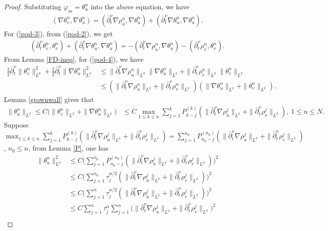 \documentclass[10pt,a4paper]{amsart}
\begin{document}
\begin{proof}
Substituting $\varphi_m=\theta_u^n$ into the above equation, we have
\begin{align}\label{pod-3}
(\nabla \theta_v^n,\nabla\theta_u^n) 
=(\bar\partial_t^\nu \nabla \rho_u^n,\nabla\theta_u^n)+(\bar\partial_t^\nu \nabla \theta_u^n,\nabla\theta_u^n).
\end{align}
For (\ref{pod-3}), from (\ref{pod-2}), we get
\begin{align}\label{pod-4}
(\bar\partial_t^\nu\theta_v^n,\theta_v^n)+(\bar\partial_t^\nu \nabla \theta_u^n,\nabla\theta_u^n)=-(\bar\partial_t^\nu \nabla \rho_u^n,\nabla\theta_u^n)-(\bar\partial_t^\nu \rho_v^n,\theta_v^n).
\end{align}
From Lemma \ref{FD-ineq}, for (\ref{pod-4}), we have
\begin{align*}
\frac12\bar\partial_t^\nu\|\theta_v^n\|_{L^2}^2+\frac12\bar\partial_t^\nu \|\nabla \theta_u^n\|_{L^2}^2
&\leq \|\bar\partial_t^\nu \nabla \rho_u^n\|_{L^2}\|\nabla\theta_u^n\|_{L^2}+\|\bar\partial_t^\nu \rho_v^n\|_{L^2}\|\theta_v^n\|_{L^2}\\
&\leq (\|\bar\partial_t^\nu \nabla \rho_u^n\|_{L^2}+\|\bar\partial_t^\nu \rho_v^n\|_{L^2})(\|\nabla\theta_u^n\|_{L^2}+\|\theta_v^n\|_{L^2}).
\end{align*}
Lemma \ref{grownwall} gives that 
\begin{align*}
\|\theta_u^n\|_{L^2}\leq C\big(\|\theta_v^n\|_{L^2}+ \|\nabla \theta_u^n\|_{L^2}\big) 
&\leq C\max_{1\leq k\leq n}\sum_{j=1}^kP_{k-j}^{(k)}(\|\bar\partial_t^\nu \nabla \rho_u^j\|_{L^2}+\|\bar\partial_t^\nu \rho_v^j\|_{L^2}),~1\leq n\leq N.
\end{align*}
Suppose $\max_{1\leq k\leq n}\sum_{j=1}^kP_{k-j}^{(k)}(\|\bar\partial_t^\nu \nabla \rho_u^j\|_{L^2}+\|\bar\partial_t^\nu \rho_v^j\|_{L^2})=\sum_{j=1}^{n_0}P_{n_0-j}^{({n_0})}(\|\bar\partial_t^\nu \nabla \rho_u^j\|_{L^2}+\|\bar\partial_t^\nu \rho_v^j\|_{L^2})$, $n_0\leq n$, from Lemma \ref{P}, one has
\begin{align*}
\|\theta_u^n\|_{L^2}^2
&\leq C\bigg(\sum_{j=1}^{n_0}P_{n_0-j}^{({n_0})}(\|\bar\partial_t^\nu \nabla \rho_u^j\|_{L^2}+\|\bar\partial_t^\nu \rho_v^j\|_{L^2})\bigg)^2\\
&\leq C\bigg(\sum_{j=1}^{n_0}\tau_j^{\alpha/2}(\|\bar\partial_t^\nu \nabla \rho_u^j\|_{L^2}+\|\bar\partial_t^\nu \rho_v^j\|_{L^2})\bigg)^2\\
&\leq C\bigg(\sum_{j=1}^{n}\tau_j^{\alpha/2}(\|\bar\partial_t^\nu \nabla \rho_u^j\|_{L^2}+\|\bar\partial_t^\nu \rho_v^j\|_{L^2})\bigg)^2\\
&\leq C\sum_{j=1}^{n}\tau_j^{\alpha}\sum_{j=1}^{n}\bigg(\|\bar\partial_t^\nu \nabla \rho_u^j\|_{L^2}+\|\bar\partial_t^\nu \rho_v^j\|_{L^2}\bigg)^2\\

\end{align*}
\end{proof}
\end{document}
